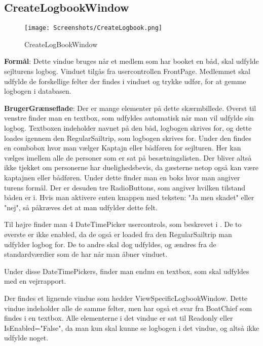 \subsection{CreateLogbookWindow}

\begin{wrapfigure}{r}{0.5\textwidth}
    \label{img:login_interface}
    \vspace{-20pt}
    \begin{center}
        \texttt{[image: Screenshots/CreateLogbook.png]}
    \end{center}
    \vspace{-15pt}
    \caption{CreateLogBookWindow}
    \vspace{-30pt}
\end{wrapfigure}

\textbf{Formål}: Dette vindue bruges når et medlem som har booket en båd, skal udfylde sejlturens logbog. Vinduet tilgås fra usercontrollen FrontPage. Medlemmet skal udfylde de forskellige felter der findes i vinduet og trykke udfør, for at gemme logbogen i databasen.

\textbf{BrugerGrænseflade}: Der er mange elementer på dette skærmbillede. Øverst til venstre finder man en textbox, som udfyldes automatisk når man vil udfylde sin logbog. 
Textboxen indeholder navnet på den båd, logbogen skrives for, og dette loades igennem den RegularSailtrip, som logbogen skrives for.
Under den findes en combobox hvor man vælger Kaptajn eller bådføren for sejlturen.
Her kan vælges imellem alle de personer som er sat på besætningslisten. 
Der bliver altså ikke tjekket om personerne har duelighedsbevis, da gæsterne netop også kan være kaptajnen eller bådføren.
Under dette finder man en boks hvor man angiver turens formål. 
Der er desuden tre RadioButtons, som angiver hvilken tilstand båden er i. 
Hvis man aktivere enten knappen med teksten: "Ja men skadet" eller "nej", så påkræves det at man udfylder dette felt. 

Til højre finder man 4 DateTimePicker usercontrols, som beskrevet i . De to øverste er ikke enabled, da de også er loaded fra den RegularSailtrip man udfylder logbog for. De to andre skal dog udfyldes, og ændres fra de standardværdier som de har når man åbner vinduet. 

Under disse DateTimePickers, finder man endnu en textbox, som skal udfyldes med en vejrrapport.

Der findes et lignende vindue som hedder ViewSpecificLogbookWindow.
Dette vindue indeholder alle de samme felter, men har også et svar fra BoatChief som findes i en textbox.
Alle elementerne i det vindue er sat til Readonly eller IsEnabled="False", da man kun skal kunne se logbogen i det vindue, og altså ikke udfylde noget.


